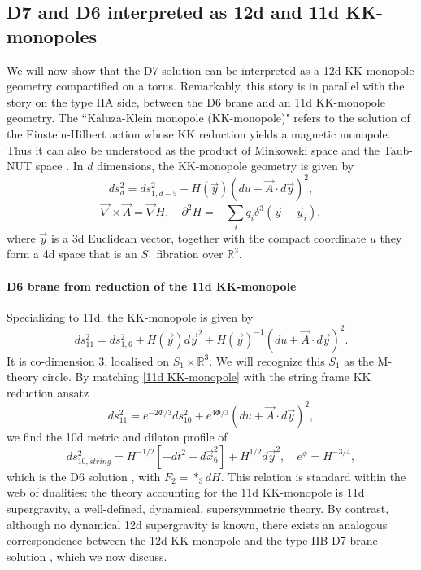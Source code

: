 \subsection{D7 and D6 interpreted as 12d and 11d KK-monopoles}
We will now show that the D7 solution can be interpreted as a 12d KK-monopole geometry compactified on a torus.
Remarkably, this story is in parallel with the story on the type IIA side, between the D6 brane and an 11d KK-monopole geometry.
The ``Kaluza-Klein monopole (KK-monopole)" \cite{Gross:1983hb,Sorkin:1983ns} refers to the solution of the Einstein-Hilbert action whose KK reduction yields a magnetic monopole.
Thus it can also be understood as the product of Minkowski space and the Taub-NUT space \cite{Ortin:2015hya}.
In $d$ dimensions, the KK-monopole geometry is given by
\cite{Eguchi:1980jx}
\begin{equation}
ds_d^2 = ds_{1,d-5}^2 + H(\vec{y})(du + \vec{A}\cdot d\vec{y})^2,
\label{d-dim KK-monopole}
\end{equation}
\begin{equation}
\vec{\nabla} \times \vec A = \vec\nabla H,\quad
\partial^2 H=-\sum_i q_i \delta^3(\vec{y}-\vec{y}_i),
\label{kk monopole einstein eqs}
\end{equation}
where $\vec{y}$ is a 3d Euclidean vector, together with the compact coordinate $u$ they form a 4d space that is an $S_1$ fibration over $\mathbb{R}^3$.

\paragraph{D6 brane from reduction of the 11d KK-monopole}
Specializing to 11d, the KK-monopole is given by
\begin{equation}
ds_{11}^2=ds_{1,6}^2 + H(\vec{y})d\vec{y}^2+H(\vec{y})^{-1}(du+\vec{A}\cdot d\vec{y})^2.
\label{11d KK-monopole}
\end{equation}
It is co-dimension 3, localised on $S_1\times\mathbb{R}^3$. 
We will recognize this $S_1$ as the M-theory circle.
By matching \eqref{11d KK-monopole} with the string frame KK reduction ansatz
\begin{equation}
ds_{11}^2=e^{-2\Phi/3}ds_{10}^2+e^{4\Phi/3}(du+ \vec{A}\cdot d\vec{y})^2,
\label{string frame KK reduction ansatz}
\end{equation}
we find the 10d metric and dilaton profile of
\begin{equation}
ds_{10,string}^2=H^{-1/2}[-dt^2+d\vec{x}_6^2] + H^{1/2}d\vec{y}^2,\quad
e^\phi=H^{-3/4},
\end{equation}
which is the D6 solution \cite{Horowitz:1991cd,Townsend:1995kk}, with $F_2=*_3 dH$.
This relation is standard within the web of dualities: the theory accounting for the 11d KK-monopole is 11d supergravity, a well-defined, dynamical, supersymmetric theory.
By contrast, although no dynamical 12d supergravity is known, there exists an analogous correspondence between the 12d KK-monopole and the type IIB D7 brane solution \cite{Tseytlin:1996ne}, which we now discuss.

